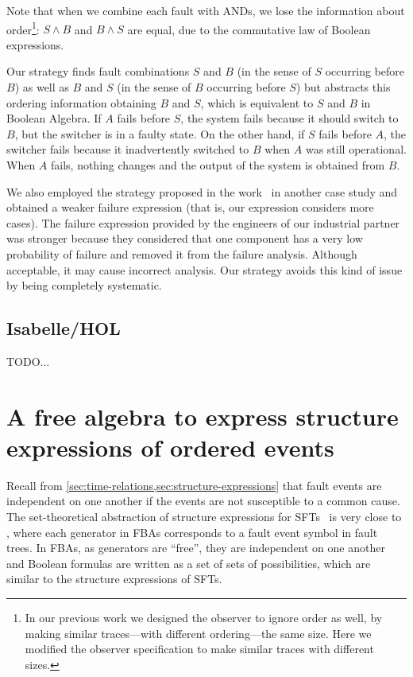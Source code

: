 \documentclass[en,twoside,onehalfspacing,phd]{risethesis}
\begin{document}
Note that when we combine each fault with ANDs, we lose the information about order\footnote{In our previous work we designed the observer to ignore order as well, by making similar traces---with different ordering---the same size. Here we modified the observer specification to make similar traces with different sizes.}: $S \land B$ and $B \land S$ are equal, due to the commutative law of Boolean expressions.

Our strategy finds fault combinations $S$ and $B$ (in the sense of $S$ occurring before $B$) as well as $B$ and $S$ (in the sense of $B$ occurring before $S$) but abstracts this ordering information obtaining $B$ and $S$, which is equivalent to $S$ and $B$ in Boolean Algebra.
%
If $A$ fails before $S$, the system fails because it should switch to $B$, but the switcher is in a faulty state.
%
On the other hand, if $S$ fails before $A$, the switcher fails because it inadvertently switched to $B$ when $A$ was still operational.
%
When $A$ fails, nothing changes and the output of the system is obtained from $B$.

We also employed the strategy proposed in the work~\cite{DM2012} in another case study and obtained a weaker failure expression (that is, our expression considers more cases).
The failure expression provided by the engineers of our industrial partner was stronger because they considered that one component has a very low probability of failure and removed it from the failure analysis.
Although acceptable, it may cause incorrect analysis.
Our strategy avoids this kind of issue by being completely systematic.

\section{Isabelle/HOL}
\label{sec:isabelle}

TODO...

\chapter{A free algebra to express structure expressions of ordered events}
\label{sec:strategy}

Recall from \cref{sec:time-relations,sec:structure-expressions} that fault events are independent on one another if the events are not susceptible to a common cause.
The set-theoretical abstraction of structure expressions for \acp{SFT}~\cite[pp. VI-11]{VGR+1981} is very close to , where each generator in \acp{FBA} corresponds to a fault event symbol in fault trees.
In \acp{FBA}, as generators are ``free'', they are independent on one another and Boolean formulas are written as a set of sets of possibilities, which are similar to the structure expressions of \acp{SFT}.
\end{document}
